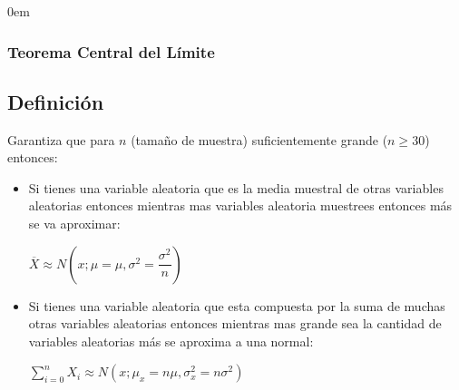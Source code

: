 \documentclass[12pt, fleqn]{report}                             %
\newenvironment{SmallIndentation}[1][0.75em]                    %
        {\begin{adjustwidth}{#1}{}\begin{footnotesize}}             %
        {\end{footnotesize}\end{adjustwidth}}                       %
\newcommand \Over               {\overline}                     %
\theoremstyle{break}                                            %
\begin{document}
                \begin{multicols}{2}
                \begin{SmallIndentation}[0em]
                    
                    \subsubsection{Teorema Central del Límite}

                        \subsection{Definición}

                            Garantiza que para $n$ (tamaño de muestra) suficientemente grande ($n \geq 30$)
                            entonces:

                            \begin{itemize}
                                \item 
                                    Si tienes una variable aleatoria que es la media muestral de otras variables aleatorias entonces
                                    mientras mas variables aleatoria muestrees entonces más se va aproximar:

                                    $\Over{X} \approx N(x; \mu = \mu, \sigma^2 = \dfrac{\sigma^2}{n})$
                                
                                \item 
                                    Si tienes una variable aleatoria que esta compuesta por la suma de muchas otras variables
                                    aleatorias entonces mientras mas grande sea la cantidad de variables aleatorias más se
                                    aproxima a una normal:

                                    $\sum_{i=0}^n X_i \approx N(x; \mu_x = n \mu, \sigma^2_x = n\sigma^2)$
                            \end{itemize}



\end{SmallIndentation}
\end{multicols}
\end{document}
